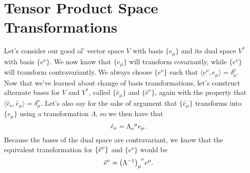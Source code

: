 \chapter{Tensor Product Space Transformations}
Let's consider our good ol' vector space $V$ with basis $\{e_\mu\}$ and its dual space $V^*$ with basis $\{e^\nu\}$.
We now know that $\{e_\mu\}$ will transform covariantly, while $\{e^\nu\}$ will transform contravariantly.
We always choose $\{e^\nu\}$ such that $\langle e^\nu, e_\mu \rangle = \delta^\nu_\mu$.
Now that we've learned about change of basis transformations, let's construct alternate bases for $V$ and $V^*$, called $\{\hat{e}_\mu\}$ and $\{\hat{e}^\nu\}$, again with the property that $\langle \hat{e}_\nu, \hat{e}_\mu \rangle = \delta_\mu^\nu$.
Let's also say for the sake of argument that $\{\hat{e}_\mu\}$ transforms into $\{e_\mu\}$ using a transformation $\Lambda$, so we then have that
\[ \Hat{e}_\nu = \tensor{\Lambda}{_\nu^\mu} e_\mu. \]
Because the bases of the dual space are contravariant, we know that the equivalent transformation for $\{\Hat{e}^\nu\}$ and $\{e^\nu\}$ would be
\[ \Hat{e}^\nu = \tensor{\qty(\Lambda^{-1})}{_\mu^\nu} e^\mu. \]

